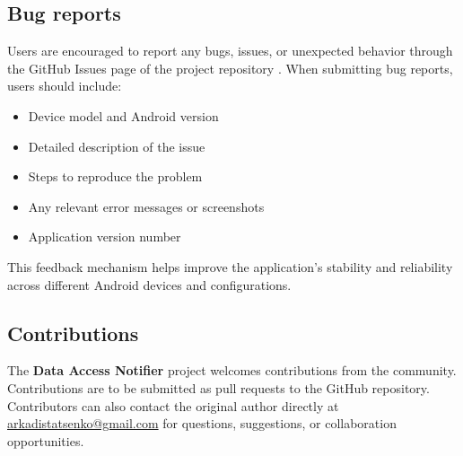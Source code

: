 \subsection{Bug reports}

Users are encouraged to report any bugs, issues, or unexpected behavior through the GitHub Issues page of the project repository \cite{data-access-notifier}. When submitting bug reports, users should include:

\begin{itemize}
    \item Device model and Android version
    \item Detailed description of the issue
    \item Steps to reproduce the problem
    \item Any relevant error messages or screenshots
    \item Application version number
\end{itemize}

This feedback mechanism helps improve the application's stability and reliability across different Android devices and configurations.

\subsection{Contributions}
The \textbf{Data Access Notifier} project welcomes contributions from the community. Contributions are to be submitted as pull requests to the GitHub repository. Contributors can also contact the original author directly at \href{mailto:arkadistatsenko@gmail.com}{arkadistatsenko@gmail.com} for questions, suggestions, or collaboration opportunities.




